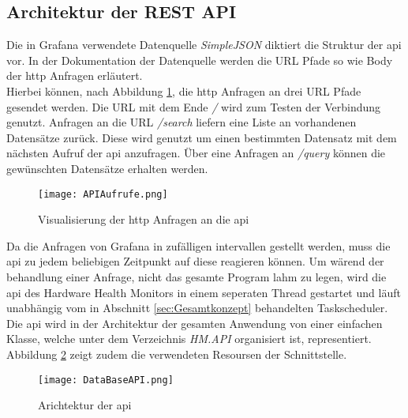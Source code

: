 \subsection{Architektur der REST API}
Die in Grafana verwendete Datenquelle \textit{SimpleJSON} diktiert die Struktur der \ac{api} vor. In der Dokumentation der Datenquelle \cite{SimpleJSON} werden die URL Pfade so wie Body der \acs{http} Anfragen erläutert.\\
Hierbei können, nach Abbildung \ref{fig:APIAnfragen}, die \ac{http} Anfragen an drei URL Pfade gesendet
 werden. Die URL mit dem Ende \glqq\textit{/}\grqq{} wird zum Testen der Verbindung genutzt. Anfragen an die URL \glqq\textit{/search}\grqq{} liefern eine Liste an vorhandenen Datensätze zurück. Diese wird genutzt um einen bestimmten Datensatz mit dem nächsten Aufruf der \ac{api} anzufragen. Über eine Anfragen an \glqq\textit{/query}\grqq{} können die gewünschten Datensätze erhalten werden.\\
\begin{center}
    \begin{figure}[h!]
        \centering
        \texttt{[image: APIAufrufe.png]}
        \caption{Visualisierung der \ac{http} Anfragen an die \ac{api}}
        \label{fig:APIAnfragen}
    \end{figure}
\end{center}
\vspace{-1.8cm}
Da die Anfragen von Grafana in zufälligen intervallen gestellt werden, muss die \ac{api} zu jedem beliebigen Zeitpunkt auf diese reagieren können. Um wärend der behandlung einer Anfrage, nicht das gesamte Program lahm zu legen, wird die \ac{api} des Hardware Health Monitors in einem seperaten Thread gestartet und läuft unabhängig vom in Abschnitt \ref{sec:Gesamtkonzept} behandelten Taskscheduler.\\
Die \ac{api} wird in der Architektur der gesamten Anwendung von einer einfachen Klasse, welche unter dem Verzeichnis \textit{HM.API} organisiert ist, representiert. Abbildung \ref{fig:UMLAPI} zeigt zudem die verwendeten Resoursen der Schnittstelle. 
\begin{center}
    \begin{figure}[h!]
        \centering
        \texttt{[image: DataBaseAPI.png]}
        \caption{Arichtektur der \ac{api}}
        \label{fig:UMLAPI}
    \end{figure}
\end{center}
\vspace{-1.8cm}